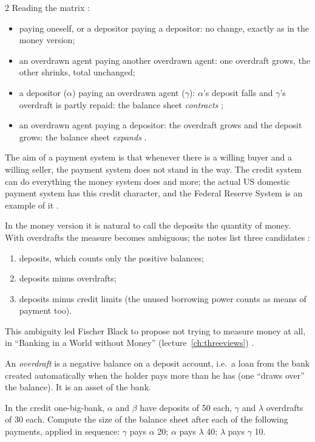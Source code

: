 \begin{paracol}{2}
Reading the matrix :
\begin{itemize}
  \item paying oneself, or a depositor paying a depositor: no change, exactly as in the money version;
  \item an overdrawn agent paying another overdrawn agent: one overdraft grows, the other shrinks, total unchanged;
  \item a depositor ($\alpha$) paying an overdrawn agent ($\gamma$): $\alpha$'s deposit falls and $\gamma$'s overdraft is partly repaid:
        the balance sheet \emph{contracts} ;
  \item an overdrawn agent paying a depositor: the overdraft grows and the deposit grows: the balance sheet \emph{expands} .
\end{itemize}
The aim of a payment system is that whenever there is a willing buyer and a willing seller, the payment system does not stand in the way.
The credit system can do everything the money system does and more; the actual US domestic payment system has this credit character, and
the Federal Reserve System is an example of it .

\begin{secondary}
In the money version it is natural to call the deposits the quantity of money. With overdrafts the measure becomes ambiguous; the notes list three
candidates :
\begin{enumerate}
  \item deposits, which counts only the positive balances;
  \item deposits minus overdrafts;
  \item deposits minus credit limits (the unused borrowing power counts as means of payment too).
\end{enumerate}
This ambiguity led Fischer Black to propose not trying to measure money at all, in ``Banking in a World without Money'' (lecture~\ref{ch:threeviews})
.
\end{secondary}

\begin{definition}
An \emph{overdraft} is a negative balance on a deposit account, i.e.\ a loan from the bank created automatically when the holder pays more
than he has (one ``draws over'' the balance). It is an asset of the bank.
\end{definition}

\begin{exercise}
In the credit one-big-bank, $\alpha$ and $\beta$ have deposits of 50 each, $\gamma$ and $\lambda$ overdrafts of 30 each. Compute the size of the balance sheet
after each of the following payments, applied in sequence: $\gamma$ pays $\alpha$ 20; $\alpha$ pays $\lambda$ 40; $\lambda$ pays $\gamma$ 10.
\end{exercise}


\end{paracol}
